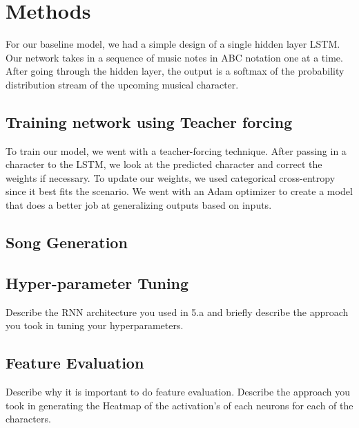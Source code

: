 \section*{Methods}
For our baseline model, we had a simple design of a single hidden layer LSTM. Our network takes in a sequence of music notes in ABC notation one at a time. After going through the hidden layer, the output is a softmax of the probability distribution stream of the upcoming musical character. 

\subsection*{Training network using Teacher forcing}
To train our model, we went with a teacher-forcing technique. After passing in a character to the LSTM, we look at the predicted character and correct the weights if necessary. To update our weights, we used categorical cross-entropy since it best fits the scenario. We went with an Adam optimizer to create a model that does a better job at generalizing outputs based on inputs.

\subsection*{Song Generation}


\subsection*{Hyper-parameter Tuning}
Describe the RNN architecture you used in 5.a and briefly describe the approach you took in tuning your hyperparameters.

\subsection*{Feature Evaluation}
Describe why it is important to do feature evaluation. Describe the approach you took in generating the Heatmap of the activation’s of each neurons for each of the characters.